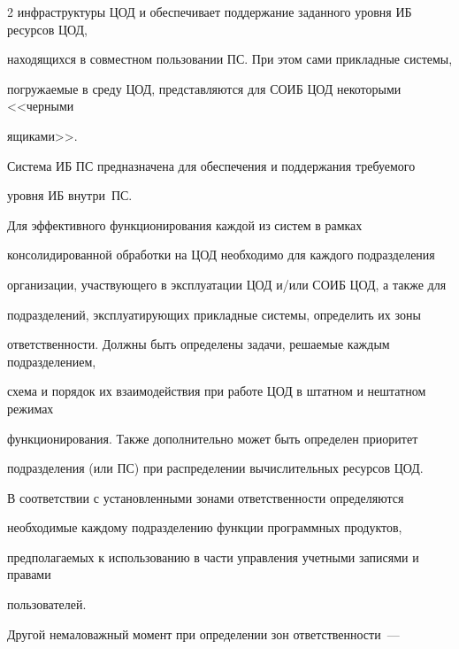 \begin{multicols}{2}
инфраструктуры ЦОД и обеспечивает поддержание заданного уровня ИБ ресурсов ЦОД, 


находящихся в совместном пользовании ПС. При этом сами прикладные сис\-те\-мы, 


погружаемые в среду ЦОД, представляются для СОИБ ЦОД некоторыми <<черными 


ящиками>>.


       


       Система ИБ ПС предназначена для обеспечения и поддержания требуемого 


уровня ИБ внут\-ри~ПС. 


Для эффективного функционирования каждой из сис\-тем в рамках 


консолидированной обработки на ЦОД необходимо для каждого подразделения 


организации, участвующего в эксплуатации ЦОД и/или СОИБ ЦОД, а также для 


подразделений, эксплуатирующих прикладные сис\-те\-мы, определить их зоны 


ответственности. Должны быть определены задачи, решаемые каждым подразделением, 


схема и порядок их взаимодействия при работе ЦОД в штатном и нештатном режимах


функционирования. Также дополнительно может быть определен приоритет 


подразделения (или ПС) при распределении вычислительных ресурсов ЦОД.


       {%





}





       В соответствии с уста\-нов\-лен\-ны\-ми зонами ответственности определяются 


необходимые каждому подразделению функции программных продуктов, 


предполагаемых к использованию в части управ\-ле\-ния учетными записями и правами 


пользова\-телей.


{%





}


       


       Другой немаловажный момент при определении зон ответственности~--- 



\end{multicols}
